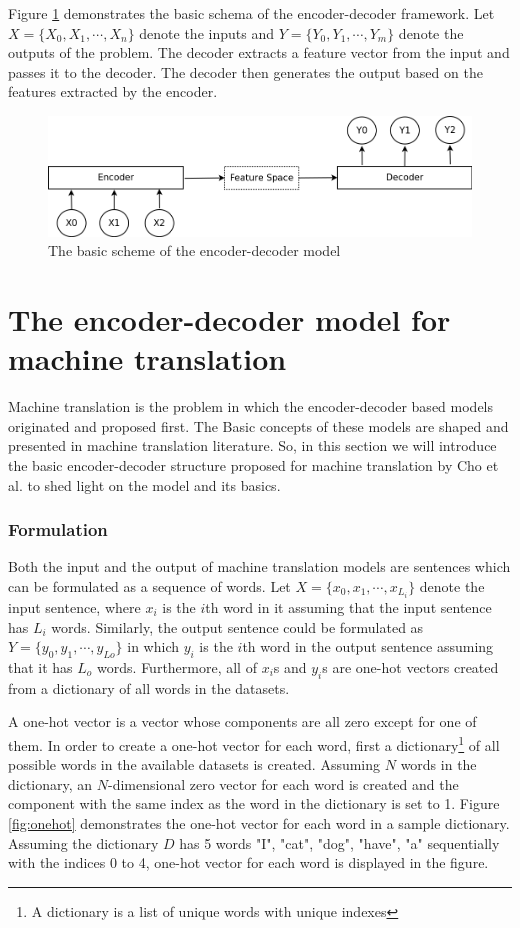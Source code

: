 \documentclass[preprint, 12pt]{elsarticle}
\begin{document}
		Figure \ref{fig:encdec} demonstrates the basic schema of the encoder-decoder framework. Let $X = \{X_0, X_1, \cdots, X_n\}$ denote the inputs and $Y = \{Y_0, Y_1, \cdots, Y_m\}$ denote the outputs of the problem. The decoder extracts a feature vector from the input and passes it to the decoder. The decoder then generates the output based on the features extracted by the encoder.
		\begin{figure}[h]
			\centering
			\includegraphics[scale=0.4]{Imgs/encoder_decoder.png}
			\caption{The basic scheme of the encoder-decoder model}
			\label{fig:encdec}
		\end{figure}
		
	
	\section{The encoder-decoder model for machine translation}
	Machine translation is the problem in which the encoder-decoder based models originated and proposed first. The Basic concepts of these models are shaped and presented in machine translation literature. So, in this section we will introduce the basic encoder-decoder structure proposed for machine translation by Cho et al. \cite{cho2014learning} to shed light on the model and its basics.
	
		\subsubsection{Formulation}
		Both the input and the output of machine translation models are sentences which can be formulated as a sequence of words. Let $X = \{x_0, x_1, \cdots, x_{L_{i}}\}$ denote the input sentence, where $x_i$ is the $i$th word in it assuming that the input sentence has $L_{i}$ words. Similarly, the output sentence could be formulated as $Y = \{y_0, y_1, \cdots, y_{L{o}}\}$ in which $y_i$ is the $i$th word in the output sentence assuming that it has $L_{o}$ words. Furthermore, all of $x_i$s and $y_i$s are one-hot vectors created from a dictionary of all words in the datasets.
		
		A one-hot vector is a vector whose components are all zero except for one of them. In order to create a one-hot vector for each word, first a dictionary\footnote{A dictionary is a list of unique words with unique indexes} of all possible words in the available datasets is created. Assuming $N$ words in the dictionary, an $N$-dimensional zero vector for each word is created and the component with the same index as the word in the dictionary is set to 1. Figure \ref{fig:onehot} demonstrates the one-hot vector for each word in a sample dictionary. Assuming the dictionary $D$ has 5 words "I", "cat", "dog", "have", "a" sequentially with the indices 0 to 4, one-hot vector for each word is displayed in the figure.
		
\end{document}
